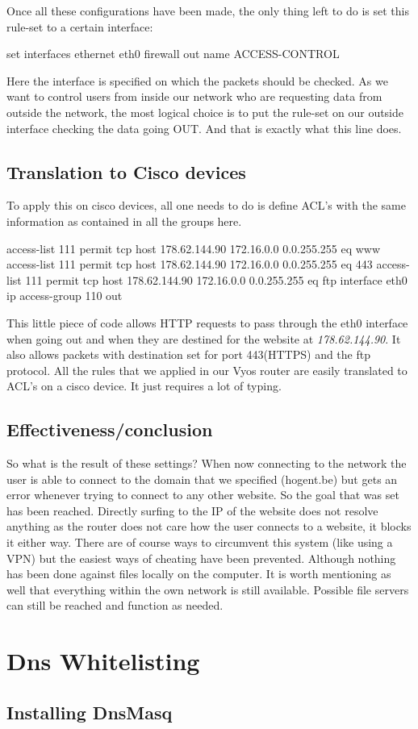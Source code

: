 Once all these configurations have been made, the only thing left to do is set this rule-set to a certain interface:
\begin{cisco}[title=Assigning the rule-set]
set interfaces ethernet eth0 firewall out name ACCESS-CONTROL
\end{cisco}
Here the interface is specified on which the packets should be checked. As we want to control users from inside our network who are requesting data from outside the network, the most logical choice is to put the rule-set on our outside interface checking the data going OUT. And that is exactly what this line does.
\subsection{Translation to Cisco devices}
To apply this on cisco devices, all one needs to do is define ACL's with the same information as contained in all the groups here. 
\begin{cisco}
access-list 111 permit tcp host 178.62.144.90 172.16.0.0 0.0.255.255 eq www
access-list 111 permit tcp host 178.62.144.90 172.16.0.0 0.0.255.255 eq 443
access-list 111 permit tcp host 178.62.144.90 172.16.0.0 0.0.255.255 eq ftp
interface eth0
ip access-group 110 out
\end{cisco}
This little piece of code allows HTTP requests to pass through the eth0 interface when going out and when they are destined for the website at \textit{178.62.144.90}.  It also allows packets with destination set for port 443(HTTPS) and the ftp protocol. All the rules that we applied in our Vyos router are easily translated to ACL's on a cisco device. It just requires a lot of typing.
\subsection{Effectiveness/conclusion}
So what is the result of these settings? When now connecting to the network the user is able to connect to the domain that we specified (hogent.be) but gets an error whenever trying to connect to any other website. So the goal that was set has been reached. Directly surfing to the IP of the website does not resolve anything as the router does not care how the user connects to a website, it blocks it either way. There are of course ways to circumvent this system (like using a VPN) but the easiest ways of cheating have been prevented. Although nothing has been done against files locally on the computer. It is worth mentioning as well that everything within the own network is still available. Possible file servers can still be reached and function as needed.
\section{Dns Whitelisting}
\subsection{Installing DnsMasq}










